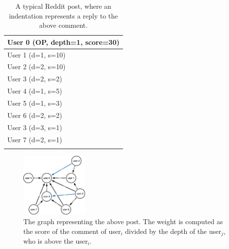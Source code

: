 \begin{table}
\centering
\begin{tabular}{l}
User 0 (OP, depth=1, score=30)  \\
\hline
\hspace{1cm} User 1 (d=1, s=10)              \\
\hline
\hspace{2cm} User 2 (d=2, s=10)            \\
\hline
\hspace{2cm} User 3 (d=2, s=2)             \\
\hline
\hspace{1cm} User 4 (d=1, s=5)             \\
\hline
\hspace{1cm} User 5 (d=1, s=3)             \\
\hline
\hspace{2cm} User 6 (d=2, s=2)             \\
\hline
\hspace{3cm} User 3 (d=3, s=1)             \\
\hline
\hspace{2cm} User  7 (d=2, s=1)            \\
\hspace{6.5cm}
\end{tabular}
\caption{A typical Reddit post, where an indentation represents a reply to the above comment.}
\label{tab:commentstruct}
\end{table}

\begin{figure}[H]
    \centering
    \includegraphics[width=0.3\textwidth]{figures/graph_model.png}
    \caption{The graph representing the above post. The weight is computed as the score of the comment of user$_i$ divided by the depth of the user$_j$, who is above the user$_i$.}
    \label{fig:graphmodel}
\end{figure}



